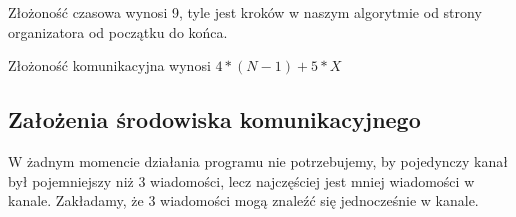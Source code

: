 \documentclass{article}
\begin{document}
Złożoność czasowa wynosi 9, tyle jest kroków w naszym algorytmie od strony organizatora od początku do końca.

Złożoność komunikacyjna wynosi $4 * (N - 1) + 5 * X$

\subsection{Założenia środowiska komunikacyjnego}

W żadnym momencie działania programu nie potrzebujemy, by pojedynczy kanał był pojemniejszy niż 3 wiadomości, lecz najczęściej jest mniej wiadomości w kanale. Zakładamy, że 3 wiadomości mogą znaleźć się jednocześnie w kanale.




\end{document}
